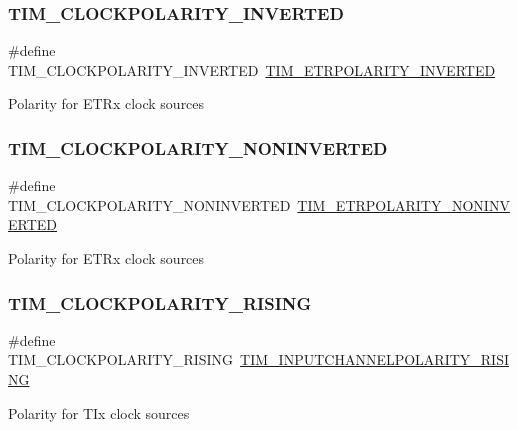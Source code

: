 \subsubsection{\texorpdfstring{TIM\_CLOCKPOLARITY\_INVERTED}{TIM\_CLOCKPOLARITY\_INVERTED}}
{\footnotesize\ttfamily \#define T\+I\+M\+\_\+\+C\+L\+O\+C\+K\+P\+O\+L\+A\+R\+I\+T\+Y\+\_\+\+I\+N\+V\+E\+R\+T\+ED~\mbox{\hyperlink{group___t_i_m___e_t_r___polarity_ga42652ff688f0042659f8304ae08abfa6}{T\+I\+M\+\_\+\+E\+T\+R\+P\+O\+L\+A\+R\+I\+T\+Y\+\_\+\+I\+N\+V\+E\+R\+T\+ED}}}

Polarity for E\+T\+Rx clock sources \mbox{\label{group___t_i_m___clock___polarity_gaca342866be2f9364274584688c733b60}} 
\subsubsection{\texorpdfstring{TIM\_CLOCKPOLARITY\_NONINVERTED}{TIM\_CLOCKPOLARITY\_NONINVERTED}}
{\footnotesize\ttfamily \#define T\+I\+M\+\_\+\+C\+L\+O\+C\+K\+P\+O\+L\+A\+R\+I\+T\+Y\+\_\+\+N\+O\+N\+I\+N\+V\+E\+R\+T\+ED~\mbox{\hyperlink{group___t_i_m___e_t_r___polarity_ga7fa7c43245b25564414b2e191d5d8b14}{T\+I\+M\+\_\+\+E\+T\+R\+P\+O\+L\+A\+R\+I\+T\+Y\+\_\+\+N\+O\+N\+I\+N\+V\+E\+R\+T\+ED}}}

Polarity for E\+T\+Rx clock sources \mbox{\label{group___t_i_m___clock___polarity_ga13cc7002cfa5ee42607e1a3d85f77b10}} 
\subsubsection{\texorpdfstring{TIM\_CLOCKPOLARITY\_RISING}{TIM\_CLOCKPOLARITY\_RISING}}
{\footnotesize\ttfamily \#define T\+I\+M\+\_\+\+C\+L\+O\+C\+K\+P\+O\+L\+A\+R\+I\+T\+Y\+\_\+\+R\+I\+S\+I\+NG~\mbox{\hyperlink{group___t_i_m___input___channel___polarity_ga4f4cede88a4ad4b33e81f2567e9bb08f}{T\+I\+M\+\_\+\+I\+N\+P\+U\+T\+C\+H\+A\+N\+N\+E\+L\+P\+O\+L\+A\+R\+I\+T\+Y\+\_\+\+R\+I\+S\+I\+NG}}}

Polarity for T\+Ix clock sources 